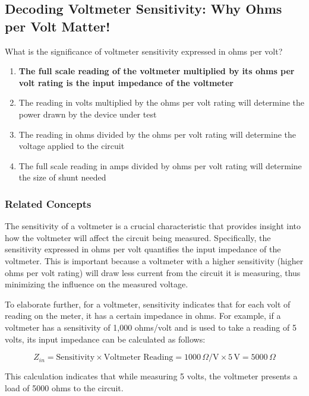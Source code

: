 \subsection{Decoding Voltmeter Sensitivity: Why Ohms per Volt Matter!}

\begin{tcolorbox}[colback=gray!10, colframe=black, title=E4B02`]
What is the significance of voltmeter sensitivity expressed in ohms per volt? 
\begin{enumerate}[label=\Alph*.]
    \item \textbf{The full scale reading of the voltmeter multiplied by its ohms per volt rating is the input impedance of the voltmeter}
    \item The reading in volts multiplied by the ohms per volt rating will determine the power drawn by the device under test
    \item The reading in ohms divided by the ohms per volt rating will determine the voltage applied to the circuit
    \item The full scale reading in amps divided by ohms per volt rating will determine the size of shunt needed
\end{enumerate} \end{tcolorbox}

\subsubsection{Related Concepts}

The sensitivity of a voltmeter is a crucial characteristic that provides insight into how the voltmeter will affect the circuit being measured. Specifically, the sensitivity expressed in ohms per volt quantifies the input impedance of the voltmeter. This is important because a voltmeter with a higher sensitivity (higher ohms per volt rating) will draw less current from the circuit it is measuring, thus minimizing the influence on the measured voltage.

To elaborate further, for a voltmeter, sensitivity indicates that for each volt of reading on the meter, it has a certain impedance in ohms. For example, if a voltmeter has a sensitivity of 1,000 ohms/volt and is used to take a reading of 5 volts, its input impedance can be calculated as follows:

\[
Z_{in} = \text{Sensitivity} \times \text{Voltmeter Reading} = 1000 \, \Omega/\text{V} \times 5 \, \text{V} = 5000 \, \Omega
\]

This calculation indicates that while measuring 5 volts, the voltmeter presents a load of 5000 ohms to the circuit.

